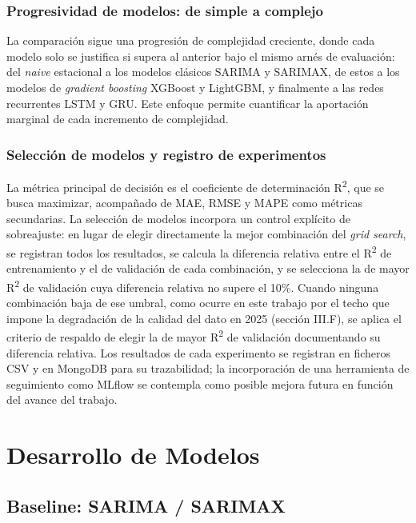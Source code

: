 \documentclass[12pt, a4paper]{article}
\begin{document}
\subsubsection{Progresividad de modelos: de simple a complejo}


La comparación sigue una progresión de complejidad creciente, donde cada modelo solo se justifica si supera al anterior bajo el mismo arnés de evaluación: del \textit{naive} estacional a los modelos clásicos SARIMA y SARIMAX, de estos a los modelos de \textit{gradient boosting} XGBoost y LightGBM, y finalmente a las redes recurrentes LSTM y GRU. Este enfoque permite cuantificar la aportación marginal de cada incremento de complejidad.

\subsubsection{Selección de modelos y registro de experimentos}


La métrica principal de decisión es el coeficiente de determinación R\textsuperscript{2}, que se busca maximizar, acompañado de MAE, RMSE y MAPE como métricas secundarias. La selección de modelos incorpora un control explícito de sobreajuste: en lugar de elegir directamente la mejor combinación del \textit{grid search}, se registran todos los resultados, se calcula la diferencia relativa entre el R\textsuperscript{2} de entrenamiento y el de validación de cada combinación, y se selecciona la de mayor R\textsuperscript{2} de validación cuya diferencia relativa no supere el 10\%. Cuando ninguna combinación baja de ese umbral, como ocurre en este trabajo por el techo que impone la degradación de la calidad del dato en 2025 (sección III.F), se aplica el criterio de respaldo de elegir la de mayor R\textsuperscript{2} de validación documentando su diferencia relativa. Los resultados de cada experimento se registran en ficheros CSV y en MongoDB para su trazabilidad; la incorporación de una herramienta de seguimiento como MLflow se contempla como posible mejora futura en función del avance del trabajo.

\section{Desarrollo de Modelos}


\subsection{Baseline: SARIMA / SARIMAX}
\end{document}
